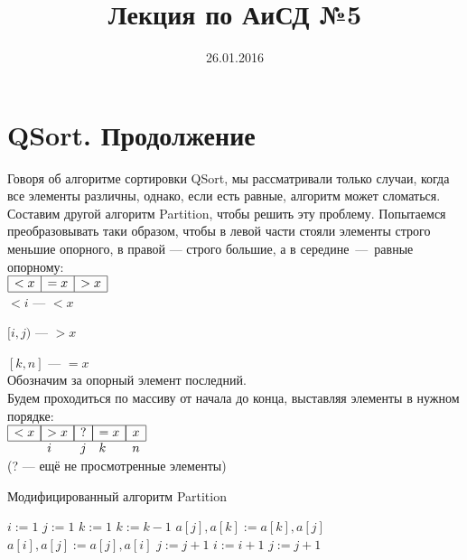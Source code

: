 \documentclass[12pt,a4paper]{article}
\title{Лекция по АиСД №5}
\date{26.01.2016}
\author{}
\begin{document}
\maketitle

\section{QSort. Продолжение}
Говоря об алгоритме сортировки QSort, мы рассматривали только случаи, когда все элементы различны, однако, если есть равные, алгоритм может сломаться. Составим другой алгоритм Partition, чтобы решить эту проблему. Попытаемся преобразовывать  таки образом, чтобы в левой части стояли элементы строго меньшие опорного, в правой — строго большие, а в середине~—~равные опорному:\\

$\begin{array}{|c|c|c|}
    \hline
    <x&=x&>x\\
    \hline
\end{array}$\\

$<i$ — $<x$

$[i, j)$ — $>x$

$[k, n]$ — $=x$\\

Обозначим за опорный элемент последний.\\
Будем проходиться по массиву от начала до конца, выставляя элементы в нужном порядке:\\

$\begin{array}{lllll}
    \hline
   	\multicolumn{1}{|c|}{< x} & \multicolumn{1}{|c|}{>x} & \multicolumn{1}{|c|}{  ?  } & \multicolumn{1}{|c|}{=x} & \multicolumn{1}{|c|}{x}\\
    \hline
    & i & j & k & n
\end{array}$
\\

(? — ещё не просмотренные элементы)

\begin{algorithm}
\caption{Модифицированный алгоритм Partition}
\begin{algorithmic}[1]
\State $i \mathrel{:=} 1$
\State $j \mathrel{:=} 1$
\State $k \mathrel{:=} 1$
		\State $k \mathrel{:=} k - 1$
		\State $a[j], a[k] \mathrel{:=} a[k], a[j]$
	\Else {}
		\State $a[i], a[j] \mathrel{:=} a[j], a[i]$
		\State $j \mathrel{:=} j + 1$
		\State $i \mathrel{:=} i + 1$
	\Else
		\State $j \mathrel{:=} j + 1$
	\EndIf
	\EndIf
\EndWhile
\EndFunction
\end{algorithmic}
\end{algorithm}
\end{document}
